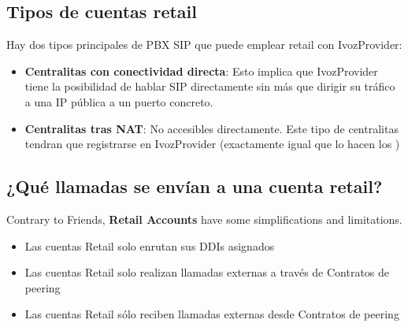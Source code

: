 \documentclass[letterpaper,10pt,spanish]{sphinxmanual}
\begin{document}
\subsection{Tipos de cuentas retail}
\label{retail/retail_accounts:types-of-retail-accounts}
Hay dos tipos principales de PBX SIP que puede emplear retail con IvozProvider:
\begin{itemize}
\item {} 
\textbf{Centralitas con conectividad directa}: Esto implica que IvozProvider tiene la posibilidad de hablar SIP directamente sin más que dirigir su tráfico a una IP pública a un puerto concreto.

\item {} 
\textbf{Centralitas tras NAT}: No accesibles directamente. Este tipo de centralitas tendran que registrarse en IvozProvider (exactamente igual que lo hacen los {\hyperref[pbx_features/terminals:terminals]{}})

\end{itemize}


\subsection{¿Qué llamadas se envían a una cuenta retail?}
\label{retail/retail_accounts:what-kind-of-calls-can-be-routed-through-a-retail-account}
Contrary to Friends, \textbf{Retail Accounts} have some simplifications and limitations.
\begin{itemize}
\item {} 
Las cuentas Retail solo enrutan sus DDIs asignados

\item {} 
Las cuentas Retail solo realizan llamadas externas a través de Contratos de peering

\item {} 
Las cuentas Retail sólo reciben llamadas externas desde Contratos de peering

\end{itemize}
\end{document}
